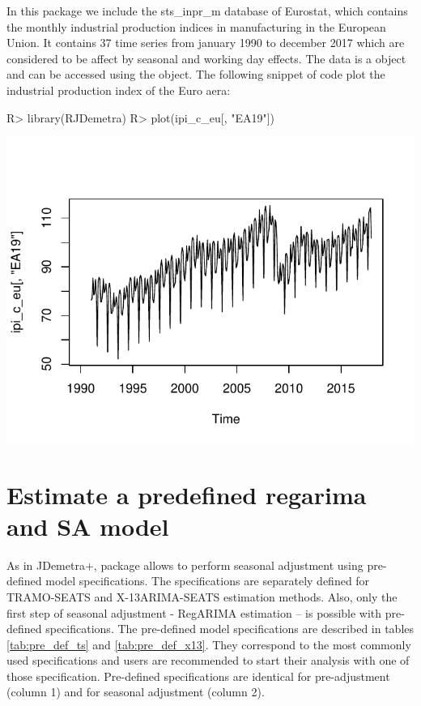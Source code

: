 \documentclass[article]{jss}
\begin{document}
In this package we include the sts\_inpr\_m database of Eurostat, which
contains the monthly industrial production indices in manufacturing in
the European Union. It contains 37 time series from january 1990 to
december 2017 which are considered to be affect by seasonal and working
day effects. The data is a  object and can be accessed using
the  object. The following snippet of code plot the
industrial production index of the Euro aera:

\begin{CodeChunk}

\begin{CodeInput}
R> library(RJDemetra)
R> plot(ipi_c_eu[, "EA19"])
\end{CodeInput}


\begin{center}\includegraphics{documentation_files/figure-latex/unnamed-chunk-2-1} \end{center}

\end{CodeChunk}

\hypertarget{estimate-a-predefined-regarima-and-sa-model}{%
\section{Estimate a predefined regarima and SA
model}\label{estimate-a-predefined-regarima-and-sa-model}}

As in JDemetra+,  package allows to perform seasonal
adjustment using pre-defined model specifications. The specifications
are separately defined for TRAMO-SEATS and X-13ARIMA-SEATS estimation
methods. Also, only the first step of seasonal adjustment - RegARIMA
estimation -- is possible with pre-defined specifications. The
pre-defined model specifications are described in tables
\ref{tab:pre_def_ts} and \ref{tab:pre_def_x13}. They correspond to the
most commonly used specifications and users are recommended to start
their analysis with one of those specification. Pre-defined
specifications are identical for pre-adjustment (column 1) and for
seasonal adjustment (column 2).
\end{document}
